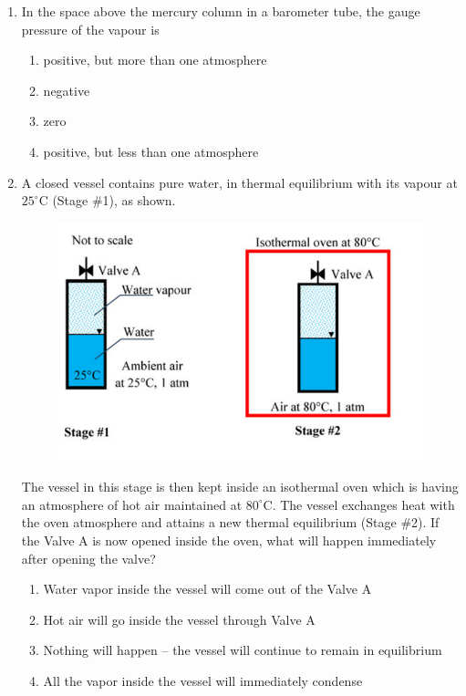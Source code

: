 \documentclass[12pt,onecolumn]{article}
\begin{document}
\begin{enumerate}
    \item In the space above the mercury column in a barometer tube, the gauge pressure of the vapour is
          \begin{enumerate}
              \item positive, but more than one atmosphere
              \item negative
              \item zero
              \item positive, but less than one atmosphere
          \end{enumerate}

    \item A closed vessel contains pure water, in thermal equilibrium with its vapour at $25^\circ$C (Stage \#1), as shown.
          \begin{figure}[H]
              \centering
              \includegraphics[scale=0.5]{q16s2}
              \label{fig:q16s2}
          \end{figure}
          The vessel in this stage is then kept inside an isothermal oven which is having an atmosphere of hot air maintained at $80^\circ$C. The vessel exchanges heat with the oven atmosphere and attains a new thermal equilibrium (Stage \#2). If the Valve A is now opened inside the oven, what will happen immediately after opening the valve?
          \begin{enumerate}
              \item Water vapor inside the vessel will come out of the Valve A
              \item Hot air will go inside the vessel through Valve A
              \item Nothing will happen -- the vessel will continue to remain in equilibrium
              \item All the vapor inside the vessel will immediately condense
          \end{enumerate}


\end{enumerate}
\end{document}
